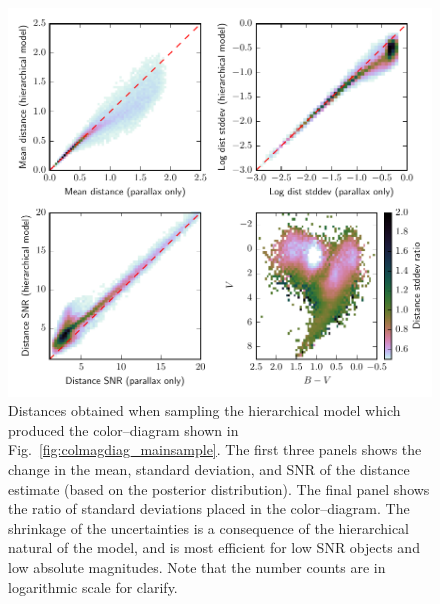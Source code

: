 \documentclass[manuscript, letterpaper]{aastex6}
\newcommand{\figref}[1]{{\xspace}Fig.~\ref{#1}}
\begin{document}
\begin{figure}
\hspace*{-3mm}\includegraphics[width=15.5cm]{colmagdiag_mainsample_dist.pdf}
\caption{Distances obtained when sampling the hierarchical model which produced the color--diagram shown in \figref{fig:colmagdiag_mainsample}. 
The first three panels shows the change in the mean, standard deviation, and SNR of the distance estimate (based on the posterior distribution). The final panel shows the ratio of standard deviations placed in the color--diagram. The shrinkage of the uncertainties is a consequence of the hierarchical natural of the model, and is most efficient for low SNR objects and low absolute magnitudes. Note that the number counts are in logarithmic scale for clarify.}
\label{fig:colmagdiag_mainsample_dist}
\end{figure}
\end{document}

